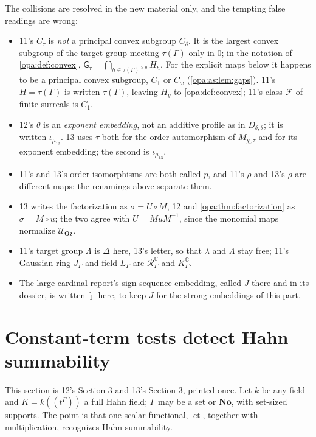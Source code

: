 \documentclass[11pt,oneside]{article}
\numberwithin{equation}{section}
\theoremstyle{definition}
\theoremstyle{remark}
\newcommand{\No}{\mathbf{No}}
\newcommand{\Oz}{\mathbf{Oz}}
\newcommand{\C}{\mathbb C}
\newcommand{\UU}{\mathcal U}
\newcommand{\ct}{\operatorname{ct}}
\newcommand{\Hahn}[2]{#1((t^{#2}))}
\newcommand{\gap}{\mathsf G}
\begin{document}
The collisions are resolved in the new material only, and the tempting false readings
are wrong:
\begin{itemize}[itemsep=1pt]
\item 11's $C_\tau$ is \emph{not} a principal convex subgroup $C_\delta$. It is the
largest convex subgroup of the target group meeting $\tau(\Gamma)$ only in $0$; in the
notation of \cref{opa:def:convex}, $\gap_\tau=\bigcap_{h\in\tau(\Gamma)^{>0}}H_h$. For
the explicit maps below it happens to be a principal convex subgroup, $C_1$ or
$C_\omega$ (\cref{opa:as:lem:gaps}). 11's $H=\tau(\Gamma)$ is written $\tau(\Gamma)$,
leaving $H_g$ to \cref{opa:def:convex}; 11's class $\mathcal F$ of finite surreals is
$C_1$.
\item 12's $\theta$ is an \emph{exponent embedding}, not an additive profile as in
$D_{\delta,\theta}$; it is written $\iota_{\mu_{12}}$. 13 uses $\tau$ both for the order
automorphism of $M_{\chi,\tau}$ and for its exponent embedding; the second is
$\iota_{\mu_{13}}$.
\item 11's and 13's order isomorphisms are both called $p$, and 11's $\rho$ and 13's
$\rho$ are different maps; the renamings above separate them.
\item 13 writes the factorization as $\sigma=U\circ M$, 12 and \cref{opa:thm:factorization}
as $\sigma=M\circ u$; the two agree with $U=MuM^{-1}$, since the monomial maps normalize
$\UU_\Oz$.
\item 11's target group $\Lambda$ is $\Delta$ here, 13's letter, so that $\lambda$ and
$\Lambda$ stay free; 11's Gaussian ring $J_\Gamma$ and field $L_\Gamma$ are
$\mathcal R^\C_\Gamma$ and $K^\C_\Gamma$.
\item The large-cardinal report's sign-sequence embedding, called $J$ there and in its
dossier, is written $\hat\jmath$ here, to keep $J$ for the strong embeddings of this part.
\end{itemize}

\section{Constant-term tests detect Hahn summability}\label{opa:as:sec:detect}

This section is 12's Section 3 and 13's Section 3, printed once. Let $k$ be any field and
$K=\Hahn k\Gamma$ a full Hahn field; $\Gamma$ may be a set or $\No$, with set-sized
supports. The point is that one scalar functional, $\ct$, together with multiplication,
recognizes Hahn summability.
\end{document}
